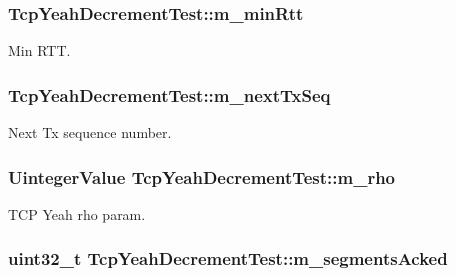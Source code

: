 \subsubsection[{\texorpdfstring{m\+\_\+min\+Rtt}{m_minRtt}}]{ Tcp\+Yeah\+Decrement\+Test\+::m\+\_\+min\+Rtt\hspace{0.3cm}{\ttfamily [private]}}\hypertarget{classTcpYeahDecrementTest_a728d66615946db9e33dc926a6487a998}{}\label{classTcpYeahDecrementTest_a728d66615946db9e33dc926a6487a998}


Min R\+TT. 

\subsubsection[{\texorpdfstring{m\+\_\+next\+Tx\+Seq}{m_nextTxSeq}}]{ Tcp\+Yeah\+Decrement\+Test\+::m\+\_\+next\+Tx\+Seq\hspace{0.3cm}{\ttfamily [private]}}\hypertarget{classTcpYeahDecrementTest_a83b74ea3dcfacc364a72f71df8749c57}{}\label{classTcpYeahDecrementTest_a83b74ea3dcfacc364a72f71df8749c57}


Next Tx sequence number. 

\subsubsection[{\texorpdfstring{m\+\_\+rho}{m_rho}}]{\setlength{\rightskip}{0pt plus 5cm}Uinteger\+Value Tcp\+Yeah\+Decrement\+Test\+::m\+\_\+rho\hspace{0.3cm}{\ttfamily [private]}}\hypertarget{classTcpYeahDecrementTest_ad98d7965f6f41d7ab3d8d00f5edcf90a}{}\label{classTcpYeahDecrementTest_ad98d7965f6f41d7ab3d8d00f5edcf90a}


T\+CP Yeah rho param. 

\subsubsection[{\texorpdfstring{m\+\_\+segments\+Acked}{m_segmentsAcked}}]{\setlength{\rightskip}{0pt plus 5cm}uint32\+\_\+t Tcp\+Yeah\+Decrement\+Test\+::m\+\_\+segments\+Acked\hspace{0.3cm}{\ttfamily [private]}}\hypertarget{classTcpYeahDecrementTest_a781689c8f518fdfea31ecb3c7b7fafa2}{}\label{classTcpYeahDecrementTest_a781689c8f518fdfea31ecb3c7b7fafa2}


